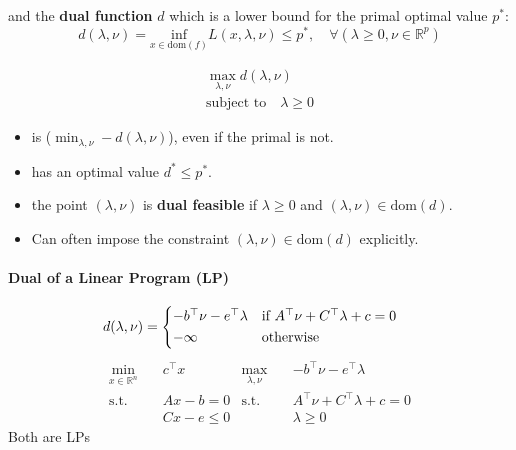 and the \textbf{dual function} $d$ which is a lower bound for the primal optimal value $p^*$:
\begin{equation*}
    d(\lambda, \nu) = \underset{x\in\text{dom}(f)}{\text{inf}} L(x,\lambda,\nu)\leq p^*, \quad \forall(\lambda \geq 0, \nu \in \mathbb{R}^p)
\end{equation*}

\noindent\begin{gather*}
    \max_{\lambda,\nu} d(\lambda, \nu) \\
    \text{subject to}\quad \lambda \geq 0
\end{gather*}
\begin{itemize}
    \item is  ($\min_{\lambda,\nu} -d(\lambda, \nu) $), even if the primal is not. %
    \item has an optimal value $d^* \leq p^*$.
    \item the point $(\lambda,\nu)$ is \textbf{dual feasible} if $\lambda \geq 0$ and $(\lambda, \nu) \in \text{dom}(d)$.
    \item Can often impose the constraint $(\lambda, \nu)\in \mathrm{dom}(d)$ explicitly. %
\end{itemize}

\paragraph{Dual of a Linear Program (LP)}
\noindent
\begin{align*}
    d(\lambda, \nu) & =\begin{cases*}
                           -b^\top\nu - e^\top \lambda & if $A^\top\nu+ C^\top\lambda+c = 0$ \\
                           -\infty                     & otherwise
                       \end{cases*}
\end{align*}
\begin{align*}
    \min_{x\in\mathbb{R}^n}\quad & c^\top x    & \max_{\lambda,\nu}\quad & - b^\top \nu - e^\top\lambda  \\
    \text{s.t.}\quad             & Ax-b = 0    & \text{s.t.}\quad        & A^\top\nu+C^\top\lambda+c = 0 \\
                                 & Cx-e \leq 0 &                         & \lambda \geq 0
\end{align*}
Both are LPs

